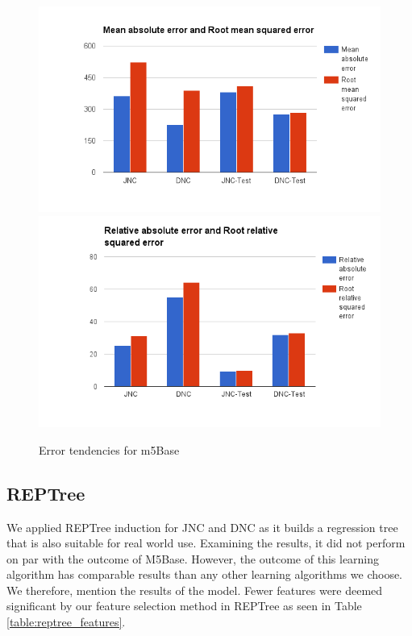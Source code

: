 \begin{figure}[h!]
\centering
\includegraphics[scale=0.4]{figures/m5Base_2.png} 
\includegraphics[scale=0.4]{figures/m5Base_3.png} 
\caption{Error tendencies for m5Base}
\label{fig:error_m5base}
\end{figure}

\subsection{REPTree}
We applied REPTree induction for JNC and DNC as it builds a regression tree that is also suitable for real world use. Examining the results, it did not perform on par with the outcome of M5Base. However, the outcome of this learning algorithm  has comparable results than any other learning algorithms we choose. We therefore, mention the results of the model. Fewer features were deemed significant by our feature selection method in REPTree as seen in Table \ref{table:reptree_features}.

